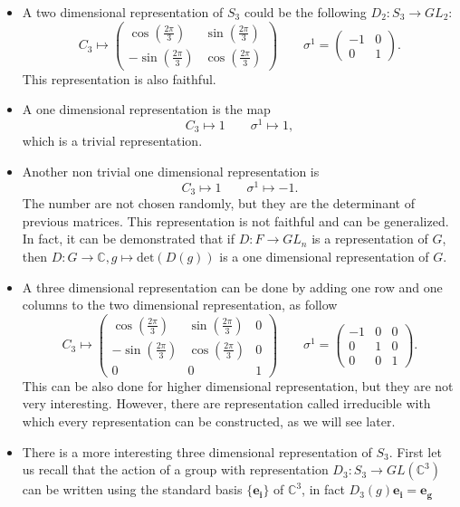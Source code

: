 \documentclass[12pt]{book}
\theoremstyle{plain}
\newcommand{\C}{\mathbb{C}}
\theoremstyle{definition}
\theoremstyle{remark}
\begin{document}
\begin{itemize}
\item A two dimensional representation of $S_3$ could be the following $D_2:S_3 \to GL_2$:
\[C_3 \mapsto \begin{pmatrix}
  \cos\left(\frac{2\pi}{3}\right) & \sin\left(\frac{2\pi}{3}\right) \\
  -\sin\left(\frac{2\pi}{3}\right) & \cos\left(\frac{2\pi}{3}\right) 
 \end{pmatrix} \qquad \sigma^1 =  \begin{pmatrix}
 -1& 0 \\
0 & 1
 \end{pmatrix}.\]
This representation is also faithful.
\item A one dimensional representation is the map
\[C_3 \mapsto 1\qquad \sigma^1 \mapsto 1,\]
which is a trivial representation.
\item Another non trivial one dimensional representation is
\[C_3\mapsto 1 \qquad \sigma^1 \mapsto -1.\]
The number are not chosen randomly, but they are the determinant of previous matrices. This representation is not faithful and can be generalized. In fact, it can be demonstrated that if $D:F\to GL_n$ is a representation of $G$, then $D:G\to \C, g\mapsto \text{det}(D(g))$ is a one dimensional representation of $G$.
\item A three dimensional representation can be done by adding one row and one columns to the two dimensional representation, as follow
\[C_3 \mapsto \begin{pmatrix}
  \cos\left(\frac{2\pi}{3}\right) & \sin\left(\frac{2\pi}{3}\right) & 0\\
  -\sin\left(\frac{2\pi}{3}\right) & \cos\left(\frac{2\pi}{3}\right) & 0\\
  0 & 0 &1 
 \end{pmatrix} \qquad \sigma^1 =  \begin{pmatrix}
 -1& 0 & 0\\
0 & 1 & 0\\
0 &0 &1
 \end{pmatrix}.\]
This can be also done for higher dimensional representation, but they are not very interesting. However, there are representation called irreducible with which every representation can be constructed, as we will see later.
\item There is a more interesting three dimensional representation of $S_3$. First let us recall that the action of a group with representation $D_3:S_3\to GL(\C^3)$ can be written using the standard basis $\{\mathbf{e_i}\}$ of $\C^3$, in fact $D_3(g)\mathbf{e_i} =\mathbf{e_g}$

\end{itemize}
\end{document}
